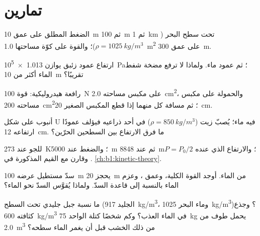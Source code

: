 \section{تمارين}

\begin{exercise}[$\star$]\label{exo:b1:fluid-statics:1}
الضغط المطلق على عمق \qty{10}{m} ثم \qty{100}{m} ثم \qty{1}{km} تحت
سطح البحر ($\rho = \qty{1025}{kg/m^3}$)؛ والقوة على كوّة مساحتها
\qty{1.0}{m^2} على عمق \qty{300}{m}.
\end{exercise}

\begin{exercise}[$\star$]\label{exo:b1:fluid-statics:2}
ارتفاع عمود زئبق يوازن \qty{1.013e5}{Pa}؛ ثم عمود ماء.
ولماذا لا ترفع مضخة شفط الماء أكثر من \qty{10}{m} تقريبًا؟
\end{exercise}

\begin{exercise}[$\star$]\label{exo:b1:fluid-statics:3}
رافعة هيدروليكية: قوة \qty{100}{N} على مكبس مساحته
\qty{2.0}{cm^2}، والحمولة على مكبس مساحته \qty{200}{cm^2}؛ ثم مسافة
كل منهما إذا قطع المكبس الصغير \qty{20}{cm}.
\end{exercise}

\begin{exercise}[$\star$]\label{exo:b1:fluid-statics:4}
أنبوب على شكل U فيه ماء؛ يُصبّ زيت ($\rho = \qty{850}{kg/m^3}$) في
أحد ذراعيه فيؤلف عمودًا ارتفاعه \qty{12}{cm}. ما فرق الارتفاع
بين السطحين الحرّين؟
\end{exercise}

\begin{exercise}[$\star\star$]\label{exo:b1:fluid-statics:5}
 للجو عند \qty{273}{K}؛ والضغط عند \qty{5000}{m}
ثم عند \qty{8848}{m}؛ والارتفاع الذي عنده $P = P_0/2$. وقارن مع
القيم المذكورة في \cref{ch:b1:kinetic-theory}.
\end{exercise}

\begin{exercise}[$\star\star$]\label{exo:b1:fluid-statics:6}
سدّ مستطيل عرضه \qty{100}{m} يحجز \qty{20}{m} من الماء. أوجد القوة
الكلية، وعمق ، وعزم الماء بالنسبة إلى قاعدة
السدّ. ولماذا يُقوَّس السدّ نحو الماء؟
\end{exercise}

\begin{exercise}[$\star\star$]\label{exo:b1:fluid-statics:7}
ما نسبة جبل جليدي تحت السطح (الجليد \qty{917}{kg/m^3}، وماء
البحر \qty{1025}{kg/m^3})؟ وجذع كثافته \qty{600}{kg/m^3} في الماء
العذب؟ وكم شخصًا كتلة الواحد \qty{75}{kg} يحمل طوف من
\qty{2.0}{m^3} من ذلك الخشب قبل أن يغمر الماء سطحه؟
\end{exercise}

